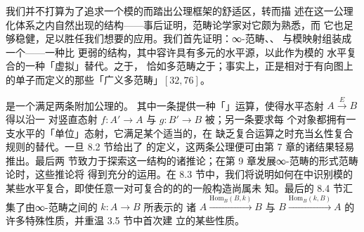 我们并不打算为了追求一个模的\trDoubleCategory{}而踏出公理框架的舒适区，转而描
述在这一公理化体系之内自然出现的结构——事后证明，范畴论学家对它颇为熟悉，而
它也足够稳健，足以胜任我们想要的应用。我们首先证明：∞-范畴、\trFunctor、%
\trModule{}与模映射组装成一个\emph{\trVirtualDoubleCategory}——一种比%
\trDoubleCategory{}更弱的结构，其中容许\trCell{}具有多元的水平源，以此作为模的
水平复合的一种「虚拟」替代。\trVirtualDoubleCategory{}之于\trDoubleCategory，
恰如多范畴之于\trMonoidalCategory{}；事实上，\trVirtualDoubleCategory{}正是相对于有向图上
的\trFreeCategory{}单子而定义的那些「广义多范畴」$[32, 76]$。

\emph{\trVirtualEquipment}是一个满足两条附加公理的\trVirtualDoubleCategory。
其中一条提供一种「\trRestrictionOfScalars{}」运算，使得水平态射 $A\xrightarrow{E}B$ 得以沿一
对竖直态射 $f\colon A'\to A$ 与 $g\colon B'\to B$ 被\trPullback；另一条要求每
个对象都拥有一支水平的「单位」态射，它满足某个适当的\trUniversalProperty，在
缺乏复合运算之时充当幺性复合规则的替代。一旦 8.2 节给出了%
\trVirtualEquipment{}的定义，这两条公理便可由第 7 章的诸结果轻易推出。最后两
节致力于探索这一结构的诸推论；在第 9 章发展∞-范畴的形式范畴论时，这些推论将
得到充分的运用。在 8.3 节中，我们将说明如何在\trVirtualEquipment{}中识别模的
某些水平复合，即使任意一对可复合的\trModule{}的\trTensorProduct{}的一般构造尚属未
知。最后的 8.4 节汇集了由∞-范畴之间的\trFunctor{} $k\colon A\to B$ 所表示的
诸\trModule{}
$A\xrightarrow{\mathrm{Hom}_{B}(B,k)}B$ 与
$B\xrightarrow{\mathrm{Hom}_{B}(k,B)}A$ 的许多特殊性质，并重温 3.5 节中首次建
立的某些性质。

